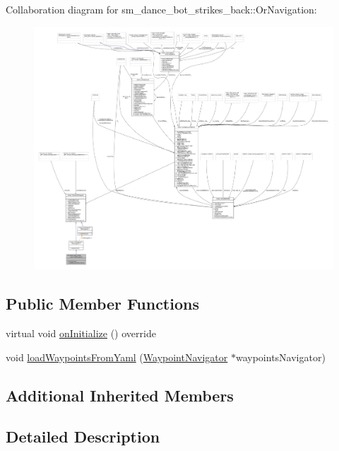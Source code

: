 Collaboration diagram for sm\+\_\+dance\+\_\+bot\+\_\+strikes\+\_\+back\+:\+:Or\+Navigation\+:
\nopagebreak
\begin{figure}[H]
\begin{center}
\leavevmode
\includegraphics[width=350pt]{classsm__dance__bot__strikes__back_1_1OrNavigation__coll__graph}
\end{center}
\end{figure}
\subsection*{Public Member Functions}
\begin{DoxyCompactItemize}
\item 
virtual void \hyperlink{classsm__dance__bot__strikes__back_1_1OrNavigation_a458a0c5fed04b9906c6943f1e7ac5bf0}{on\+Initialize} () override
\item 
void \hyperlink{classsm__dance__bot__strikes__back_1_1OrNavigation_abd8811831075be61ad28fe4a68fc738d}{load\+Waypoints\+From\+Yaml} (\hyperlink{classcl__move__base__z_1_1WaypointNavigator}{Waypoint\+Navigator} $\ast$waypoints\+Navigator)
\end{DoxyCompactItemize}
\subsection*{Additional Inherited Members}


\subsection{Detailed Description}


